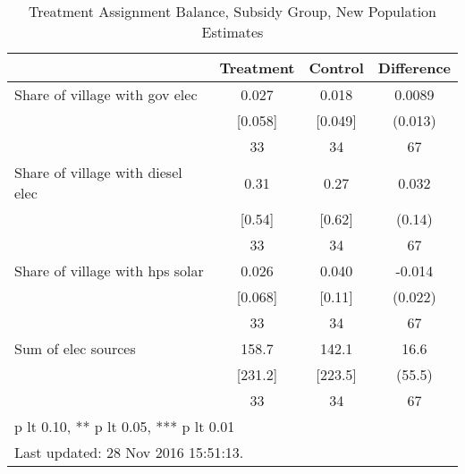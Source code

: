 \begin{table}[htbp]\centering
\def\sym#1{\ifmmode^{#1}\else\(^{#1}\)\fi}
\caption{Treatment Assignment Balance, Subsidy Group, New Population Estimates \label{tab:"balance"}}
\begin{tabular*}{0.9\hsize}{@{\hskip\tabcolsep\extracolsep\fill}l*{1}{ccc}}
\toprule
                                &Treatment&  Control&Difference         \\
\midrule
Share of village with gov elec  &    0.027&    0.018&   0.0089         \\
                                &  [0.058]&  [0.049]&  (0.013)         \\
                                &       33&       34&       67         \\
Share of village with diesel elec&     0.31&     0.27&    0.032         \\
                                &   [0.54]&   [0.62]&   (0.14)         \\
                                &       33&       34&       67         \\
Share of village with hps solar &    0.026&    0.040&   -0.014         \\
                                &  [0.068]&   [0.11]&  (0.022)         \\
                                &       33&       34&       67         \\
Sum of elec sources             &    158.7&    142.1&     16.6         \\
                                &  [231.2]&  [223.5]&   (55.5)         \\
                                &       33&       34&       67         \\
\bottomrule
\multicolumn{4}{l}{\footnotesize * p lt 0.10, ** p lt 0.05, *** p lt 0.01}\\
\multicolumn{4}{l}{\footnotesize Last updated: 28 Nov 2016 15:51:13.}\\
\end{tabular*}
\end{table}
